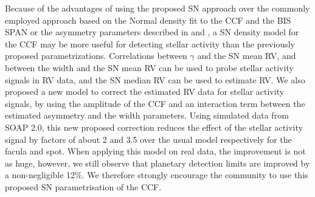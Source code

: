\documentclass{aa}
\begin{document}
Because of the advantages of using the proposed SN approach over the commonly employed approach based on the Normal density fit to the CCF and the BIS SPAN or the asymmetry parameters described in \citet{Boisse-2011} and \citet{Figueira-2013}, a SN density model for the CCF may be more useful for detecting stellar activity than the previously proposed parametrizations.
Correlations between $\gamma$ and the SN mean RV, and between the width and the SN mean RV can be used to probe stellar activity signals in RV data, and the SN median RV can be used to estimate RV.
We also proposed a new model to correct the estimated RV data for stellar activity signals, by using the amplitude of the CCF and an interaction term between the estimated asymmetry and the width parameters. Using simulated data from SOAP 2.0, this new proposed correction reduces the effect of the stellar activity signal by factors of about 2 and 3.5 over the usual model respectively for the facula and spot. When applying this model on real data, the improvement is not as huge, however, we still observe that planetary detection limits are improved by a non-negligible 12\%.
We therefore strongly encourage the community to use this proposed SN parametrisation of the CCF.



\end{document}
